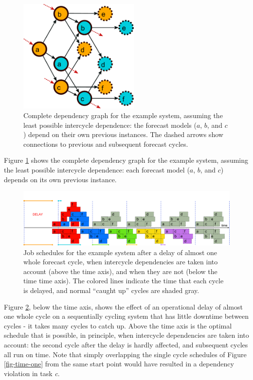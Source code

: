 \documentclass[11pt,a4paper]{article}
\begin{document}
\begin{figure} \begin{center}
    \includegraphics[width=6cm]{dependencies-two} \end{center}
    \caption{\small Complete dependency graph for the example
    system, assuming the least possible intercycle dependence: the
    forecast models ($a$, $b$, and $c$) depend on their own previous
    instances. The dashed arrows show connections to previous and
    subsequent forecast cycles.} 
    \label{fig-dep-two}
\end{figure}

Figure \ref{fig-dep-two} shows the complete dependency graph for the
example system, assuming the least possible intercycle dependence: each
forecast model ($a$, $b$, and $c$) depends on its own previous instance.

\begin{figure} 
    \begin{center} 
        \includegraphics[width=12cm]{timeline-three}
    \end{center} 
    \caption{\small Job schedules for the example system after a delay
    of almost one whole forecast cycle, when intercycle dependencies are
    taken into account (above the time axis), and when they are not
    (below the time time axis). The colored lines indicate the time that
    each cycle is delayed, and normal ``caught up'' cycles
    are shaded gray.} 
    \label{fig-time-three}
\end{figure} 

Figure \ref{fig-time-three}, below the time axis, shows the effect of an
operational delay of almost one whole cycle on a sequentially cycling
system that has little downtime between cycles - it takes many cycles to
catch up. Above the time axis is the optimal schedule that is possible,
in principle, when intercycle dependencies are taken into account: the
second cycle after the delay is hardly affected, and subsequent cycles
all run on time.  Note that simply overlapping the single cycle
schedules of Figure \ref{fig-time-one} from the same start point would
have resulted in a dependency violation in task {\em c}.
\end{document}
